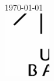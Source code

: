 \begin{titlepage}
\begin{center}
\vfill

{\large \today} \\[1.5cm]



\includegraphics[width=0.15\textwidth]{figures/unilogoschwarz}%
\end{center}
\end{titlepage}
